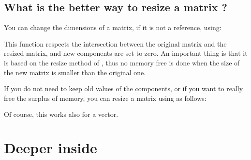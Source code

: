 \documentclass[a4paper,11pt,english]{sphinxmanual}
\begin{document}
\section{What is the better way to resize a matrix ?}
\label{\detokenize{gmm/first-step:what-is-the-better-way-to-resize-a-matrix}}
You can change the dimensions of a matrix, if it is not a reference, using:

\begin{sphinxVerbatim}[commandchars=\\\{\}]
  
\end{sphinxVerbatim}

This function respects the intersection between the original matrix and the resized matrix, and new components are set to zero. An important thing is that it is based on the resize method of , thus no memory free is done when the size of the new matrix is smaller than the original one.

If you do not need to keep old values of the components, or if you want to really free the surplus of memory, you can resize a matrix using  as follows:

\begin{sphinxVerbatim}[commandchars=\\\{\}]
  

  

       
\end{sphinxVerbatim}

Of course, this works also for a vector.


\chapter{Deeper inside }
\label{\detokenize{gmm/inside:deeper-inside-gmm}}\label{\detokenize{gmm/inside:gmm-inside}}\label{\detokenize{gmm/inside::doc}}
\end{document}
